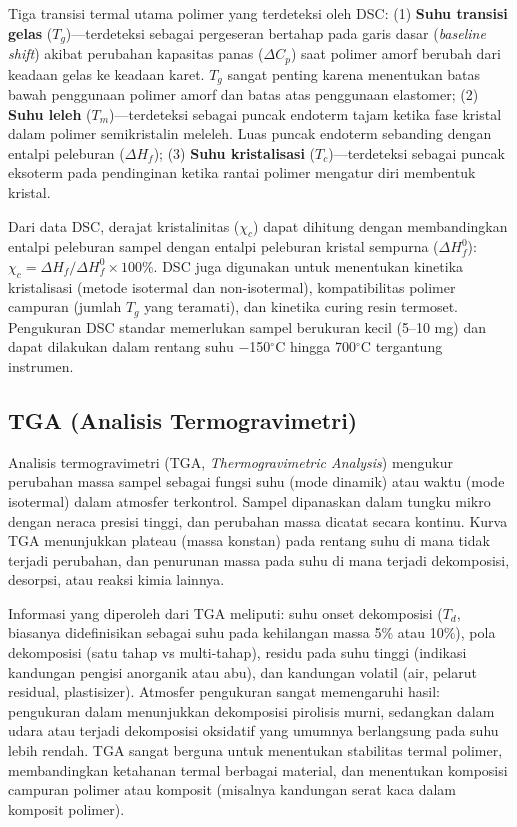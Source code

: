 \documentclass[12pt,a4paper,openany]{book}
\begin{document}
Tiga transisi termal utama polimer yang terdeteksi oleh DSC: (1) \textbf{Suhu transisi gelas} ($T_g$)---terdeteksi sebagai pergeseran bertahap pada garis dasar (\textit{baseline shift}) akibat perubahan kapasitas panas ($\Delta C_p$) saat polimer amorf berubah dari keadaan gelas ke keadaan karet. $T_g$ sangat penting karena menentukan batas bawah penggunaan polimer amorf dan batas atas penggunaan elastomer; (2) \textbf{Suhu leleh} ($T_m$)---terdeteksi sebagai puncak endoterm tajam ketika fase kristal dalam polimer semikristalin meleleh. Luas puncak endoterm sebanding dengan entalpi peleburan ($\Delta H_f$); (3) \textbf{Suhu kristalisasi} ($T_c$)---terdeteksi sebagai puncak eksoterm pada pendinginan ketika rantai polimer mengatur diri membentuk kristal.

Dari data DSC, derajat kristalinitas ($\chi_c$) dapat dihitung dengan membandingkan entalpi peleburan sampel dengan entalpi peleburan kristal sempurna ($\Delta H_f^0$): $\chi_c = \Delta H_f / \Delta H_f^0 \times 100\%$. DSC juga digunakan untuk menentukan kinetika kristalisasi (metode isotermal dan non-isotermal), kompatibilitas polimer campuran (jumlah $T_g$ yang teramati), dan kinetika curing resin termoset. Pengukuran DSC standar memerlukan sampel berukuran kecil (5--10 mg) dan dapat dilakukan dalam rentang suhu $-$150$^\circ$C hingga 700$^\circ$C tergantung instrumen.

\subsection{TGA (Analisis Termogravimetri)}

Analisis termogravimetri (TGA, \textit{Thermogravimetric Analysis}) mengukur perubahan massa sampel sebagai fungsi suhu (mode dinamik) atau waktu (mode isotermal) dalam atmosfer terkontrol. Sampel dipanaskan dalam tungku mikro dengan neraca presisi tinggi, dan perubahan massa dicatat secara kontinu. Kurva TGA menunjukkan plateau (massa konstan) pada rentang suhu di mana tidak terjadi perubahan, dan penurunan massa pada suhu di mana terjadi dekomposisi, desorpsi, atau reaksi kimia lainnya.

Informasi yang diperoleh dari TGA meliputi: suhu onset dekomposisi ($T_d$, biasanya didefinisikan sebagai suhu pada kehilangan massa 5\% atau 10\%), pola dekomposisi (satu tahap vs multi-tahap), residu pada suhu tinggi (indikasi kandungan pengisi anorganik atau abu), dan kandungan volatil (air, pelarut residual, plastisizer). Atmosfer pengukuran sangat memengaruhi hasil: pengukuran dalam  menunjukkan dekomposisi pirolisis murni, sedangkan dalam udara atau  terjadi dekomposisi oksidatif yang umumnya berlangsung pada suhu lebih rendah. TGA sangat berguna untuk menentukan stabilitas termal polimer, membandingkan ketahanan termal berbagai material, dan menentukan komposisi campuran polimer atau komposit (misalnya kandungan serat kaca dalam komposit polimer).
\end{document}
